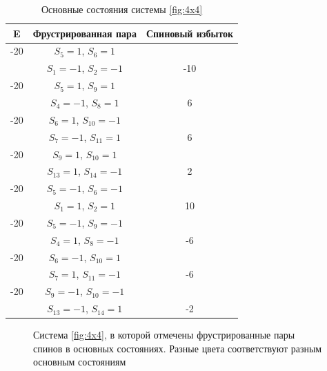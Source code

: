 \documentclass[utf8, babel, sor, jor, amsmath,amssymb, reprint]{elsarticle} %
\begin{document}
\begin{table}[h]
	\centering
	\begin{tabular}{|c|c|c|}
		\hline
		E   &   Фрустрированная пара & Спиновый избыток \\
		\hline
		-20   &  $S_5=1$, $S_6=1$& \\
		&    $S_1=-1$, $S_2=-1$ & -10\\
		\hline
		-20   &  $S_5=1$, $S_9=1$& \\
		&    $S_4=-1$, $S_8=1$& 6\\
		\hline
		-20   &  $S_6=1$, $S_{10}=-1$&\\
		&    $S_7=-1$, $S_{11}=1$& 6\\
		\hline
		-20   &  $S_9=1$, $S_{10}=1$&\\
		&    $S_{13}=1$, $S_{14}=-1$& 2\\
		\hline
		-20   &  $S_5=-1$, $S_6=-1$&\\
		&    $S_1=1$, $S_2=1$& 10\\
		\hline
		-20   &  $S_5=-1$, $S_9=-1$&\\
		&    $S_4=1$, $S_8=-1$& -6\\
		\hline
		-20   &  $S_6=-1$, $S_{10}=1$&\\
		&    $S_7=1$, $S_{11}=-1$& -6\\
		\hline
		-20   &  $S_9=-1$, $S_{10}=-1$&\\
		&    $S_{13}=-1$, $S_{14}=1$& -2\\
		\hline
	\end{tabular}
	\caption{Основные состояния системы \ref{fig:4x4}}
	\label{tab:gs_4x4}
\end{table}

\begin{figure}[h]
	\centering
	\caption{Система \ref{fig:4x4}, в которой отмечены фрустрированные пары спинов в основных состояниях. Разные цвета соответствуют разным основным состояниям}
	\label{fig:4x4.1}
\end{figure}
\end{document}

